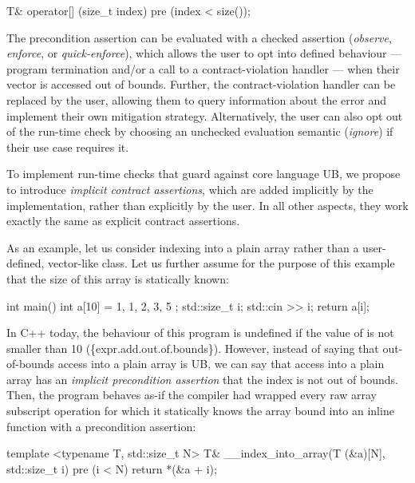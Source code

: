 \begin{codeblock}
T& operator[] (size_t index)
  pre (index < size());
\end{codeblock}

The precondition assertion  can be evaluated with a checked assertion  (\emph{observe}, \emph{enforce}, or \emph{quick-enforce}), which allows the user to opt into defined behaviour --- program termination and/or a call to a contract-violation handler --- when their vector is accessed out of bounds. Further, the contract-violation handler can be replaced by the user, allowing them to query information about the error and implement their own mitigation strategy. Alternatively, the user can also opt out of the run-time check by choosing an unchecked evaluation semantic (\emph{ignore}) if their use case requires it.

To implement run-time checks that guard against core language UB, we propose to introduce \emph{implicit contract assertions}, which are added implicitly by the implementation, rather than explicitly by the user. In all other aspects, they work exactly the same as explicit contract assertions.

As an example, let us consider indexing into a plain array rather than a user-defined, vector-like class. Let us further assume for the purpose of this example that the size  of this array is statically known:

\begin{codeblock}
int main() {
  int a[10] = { 1, 1, 2, 3, 5 };
  std::size_t i; 
  std::cin >> i;
  return a[i];
}
\end{codeblock}

In C++ today, the behaviour of this program is undefined if the value of  is not smaller than 10 (\{expr.add.out.of.bounds\}). However, instead of saying that out-of-bounds access into a plain array is UB, we can say that access into a plain array has an \emph{implicit precondition assertion} that the index is not out of bounds. Then, the program behaves as-if the compiler had wrapped every raw array subscript operation for which it statically knows the array bound  into an inline function with a precondition assertion:

\begin{codeblock}
template <typename T, std::size_t N>
T& __index_into_array(T (&a)[N], std::size_t i) 
pre (i < N) {
  return *(&a + i);
}
\end{codeblock}

